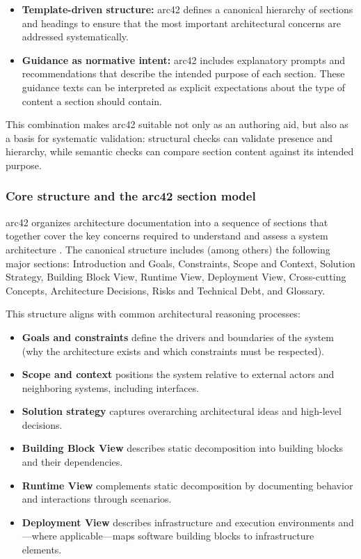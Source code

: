 \begin{itemize}
    \item \textbf{Template-driven structure:} arc42 defines a canonical hierarchy of sections and headings to ensure that the most important architectural concerns are addressed systematically.
    \item \textbf{Guidance as normative intent:} arc42 includes explanatory prompts and recommendations that describe the intended purpose of each section. These guidance texts can be interpreted as explicit expectations about the type of content a section should contain.
\end{itemize}

This combination makes arc42 suitable not only as an authoring aid, but also as a basis for systematic validation: structural checks can validate presence and hierarchy, while semantic checks can compare section content against its intended purpose.

\subsubsection{Core structure and the arc42 section model}
arc42 organizes architecture documentation into a sequence of sections that together cover the key concerns required to understand and assess a system architecture \cite{arc42_template}. The canonical structure includes (among others) the following major sections: Introduction and Goals, Constraints, Scope and Context, Solution Strategy, Building Block View, Runtime View, Deployment View, Cross-cutting Concepts, Architecture Decisions, Risks and Technical Debt, and Glossary.

This structure aligns with common architectural reasoning processes:
\begin{itemize}
    \item \textbf{Goals and constraints} define the drivers and boundaries of the system (why the architecture exists and which constraints must be respected).
    \item \textbf{Scope and context} positions the system relative to external actors and neighboring systems, including interfaces.
    \item \textbf{Solution strategy} captures overarching architectural ideas and high-level decisions.
    \item \textbf{Building Block View} describes static decomposition into building blocks and their dependencies.
    \item \textbf{Runtime View} complements static decomposition by documenting behavior and interactions through scenarios.
    \item \textbf{Deployment View} describes infrastructure and execution environments and—where applicable—maps software building blocks to infrastructure elements.
\end{itemize}

